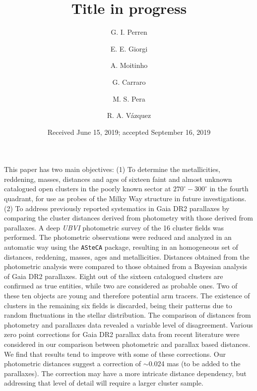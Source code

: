 \documentclass[draft]{aa}
\begin{document}
 \title{Title in progress}


\author{G. I. Perren
      \and
      E. E. Giorgi
      \and
      A. Moitinho
      \and
      G. Carraro
      \and
      M. S. Pera
      \and
      R. A. Vázquez
}


\date{Received June 15, 2019; accepted September 16, 2019}

\abstract
{}
{This paper has two main objectives: (1) To determine the metallicities,
reddening, masses, distances and ages of sixteen faint and almost unknown
catalogued open clusters in the poorly known sector at $270^\circ-300^\circ$ in
the fourth quadrant, for use as probes of the Milky Way structure in future
investigations. (2) To address previously reported systematics in Gaia DR2
parallaxes by comparing the cluster distances derived from photometry with
those derived from parallaxes.}
%
{A deep \textit{UBVI} photometric survey of the 16 cluster fields was
performed. The photometric observations were reduced and analyzed in an
automatic way using the \texttt{ASteCA} package, resulting in an homogeneous
set of distances, reddening, masses, ages and metallicities. Distances obtained
from the photometric analysis were compared to those obtained from a Bayesian
analysis of Gaia DR2 parallaxes.}
%
{Eight out of the sixteen catalogued clusters are confirmed as true entities,
while two are considered as probable ones. Two of these ten objects are
young and therefore potential arm tracers. The existence of clusters in the
remaining six fields is discarded, being their patterns due to random
fluctuations in the stellar distribution. The comparison of distances from
photometry and parallaxes data revealed a variable level of disagreement.}
%
{
Various zero point corrections for Gaia DR2 parallax data from recent
literature were considered in our comparison between photometric and parallax
based distances. We find that results tend to improve with some of these
corrections. Our photometric distances suggest a correction of $\sim$0.024 mas 
(to be added to the parallaxes). The correction may have a more intricate
distance dependency, but addressing that level of detail will require a larger
cluster sample.}
\end{document}
